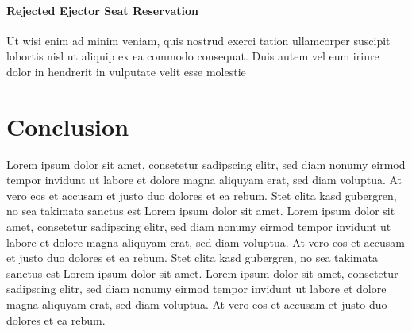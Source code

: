 \documentclass{vgtc}                          %
\begin{document}
\paragraph{Rejected Ejector Seat Reservation}

Ut wisi enim ad minim veniam, quis nostrud exerci tation ullamcorper
suscipit lobortis nisl ut aliquip ex ea commodo consequat. Duis autem
vel eum iriure dolor in hendrerit in vulputate velit esse molestie


\section{Conclusion}

Lorem ipsum dolor sit amet, consetetur sadipscing elitr, sed diam
nonumy eirmod tempor invidunt ut labore et dolore magna aliquyam erat,
sed diam voluptua. At vero eos et accusam et justo duo dolores et ea
rebum. Stet clita kasd gubergren, no sea takimata sanctus est Lorem
ipsum dolor sit amet. Lorem ipsum dolor sit amet, consetetur
sadipscing elitr, sed diam nonumy eirmod tempor invidunt ut labore et
dolore magna aliquyam erat, sed diam voluptua. At vero eos et accusam
et justo duo dolores et ea rebum. Stet clita kasd gubergren, no sea
takimata sanctus est Lorem ipsum dolor sit amet. Lorem ipsum dolor sit
amet, consetetur sadipscing elitr, sed diam nonumy eirmod tempor
invidunt ut labore et dolore magna aliquyam erat, sed diam
voluptua. At vero eos et accusam et justo duo dolores et ea
rebum.



%

%
%
%


\end{document}
